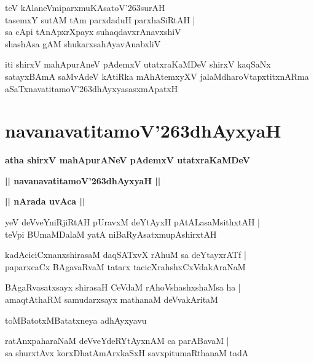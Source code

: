 \documentclass[twoside,12pt,openright]{book}
\def\S{\char'263}
\newcounter{shloka}[chapter]
\def\uvaca#1{\centerline{{\large\textbf{#1}}}}
\begin{document}
\begin{shloka}%
teV kAlaneVmiparxmuKAsatoV\S surAH \\
tasemxY sutAM tAm parxdaduH parxhaSiRtAH |\\
sa cApi tAnApxrXpayx suhaqdavxrAnavxshiV \\
shashAsa gAM shukarxsahAyavAnabxliV
\end{shloka}

\begin{center}
iti shirxV mahApurAneV pAdemxV utatxraKaMDeV shirxV kaqSaNx satayxBAmA saMvAdeV kAtiRka 
mAhAtemxyXV jalaMdharoVtapxtitxnARma aSaTxnavatitamoV\S dhAyxyasasxmApatxH 
\end{center}

\chapter{navanavatitamoV\S dhAyxyaH}

\begin{center}
{\LARGE\bfseries atha shirxV mahApurANeV pAdemxV utatxraKaMDeV}
\end{center}

\begin{center}
{\LARGE\bfseries || navanavatitamoV\S dhAyxyaH || }
\end{center}

\uvaca{|| nArada uvAca ||}

\begin{shloka}%
yeV deVveYniRjiRtAH pUravxM deYtAyxH pAtALasaMsithxtAH |\\
teVpi BUmaMDalaM yatA niBaRyAsatxmupAshirxtAH 
\end{shloka}

\begin{shloka}%
kadAciciCxnanxshirasaM daqSATxvX rAhuM sa deYtayxrATf |\\
paparxcaCx BAgavaRvaM tatarx tacicXrahshxCxVdakAraNaM 
\end{shloka}

\begin{shloka}%
BAgaRvasatxsayx shirasaH CeVdaM rAhoVshashxshaMsa ha |\\
amaqtAthaRM samudarxsayx mathanaM deVvakAritaM 
\end{shloka}

\begin{center}
toMBatotxMBatatxneya adhAyxyavu
\end{center}

\begin{shloka}%
ratAnxpaharaNaM deVveYdeRYtAyxnAM ca parABavaM |\\
sa shurxtAvx korxDhatAmArxkaSxH savxpitumaRthanaM tadA 
\end{shloka}
\end{document}
